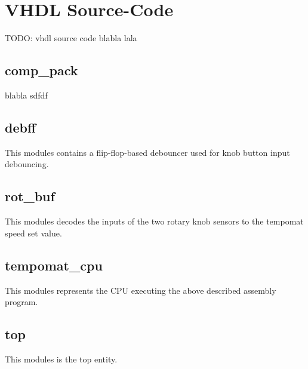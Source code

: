 \documentclass[a4paper,10pt]{scrartcl}
\begin{document}
\section{VHDL Source-Code}
\label{sec:vhdl}


TODO: vhdl source code blabla lala

\subsection{comp\_pack}
blabla sdfdf



\subsection{debff}
This modules contains a flip-flop-based debouncer used for knob button input debouncing. 





\subsection{rot\_buf}
This modules decodes the inputs of the two rotary knob sensors to the tempomat speed set value. 





\subsection{tempomat\_cpu}
This modules represents the CPU executing the above described assembly program. 





\subsection{top}
This modules is the top entity. 


\end{document}
